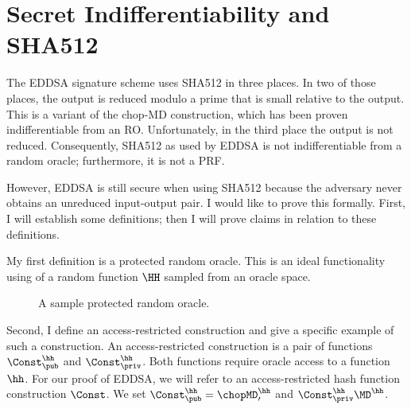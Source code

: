 \section{Secret Indifferentiability and SHA512}

The EDDSA signature scheme uses SHA512 in three places. In two of those places, the output is reduced modulo a prime that is small relative to the output. This is a variant of the chop-MD construction, which has been proven indifferentiable from an RO. Unfortunately, in the third place the output is not reduced. Consequently, SHA512 as used by EDDSA is not indifferentiable from a random oracle; furthermore, it is not a PRF. 

However, EDDSA is still secure when using SHA512 because the adversary never obtains an unreduced input-output pair. I would like to prove this formally. First, I will establish some definitions; then I will prove claims in relation to these definitions.

My first definition is a protected random oracle. This is an ideal functionality using of a random function $\HH$ sampled from an oracle space.

\begin{figure}
	\vspace{5pt}
	\caption{A sample protected random oracle.}
	\label{fig-protected-RO}
\end{figure}

Second, I define an access-restricted construction and give a specific example of such a construction. An access-restricted construction is a pair of functions $\Const^{\hh}_{\pub}$ and $\Const^{\hh}_{\priv}$. Both functions require oracle access to a function $\hh$. For our proof of EDDSA, we will refer to an access-restricted hash function construction $\Const$. We set $\Const^{\hh}_{\pub} = \chopMD_\prime^{\hh}$ and $\Const^{\hh}_{\priv} \MD^{\hh}$.

